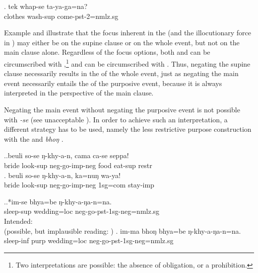 \exg. tek whap-se ta-ya-ga=na?\\
		clothes   wash{\sc -sup} come{\sc -pst-2=nmlz.sg}\\

Example \Next  and \NNext illustrate that the focus inherent in the  (and the illocutionary force in \Next) may either be on the supine clause or on the whole event, but not on the main clause alone. Regardless of the focus options, both \Next[a] and \Next[b] can be circumscribed with ,\footnote{Two interpretations are possible: the absence of obligation, or a prohibition.} and \LLast[a] can be circumscribed with . Thus, negating the supine clause necessarily results in the  of the whole event, just as negating the main event necessarily entails the  of the purposive event, because it is always interpreted in the perspective of the main clause. 

\newpage
Negating the main event without negating the purposive event is not possible with \emph{-se} (see unacceptable \NNext[a]).  In order to achieve such an interpretation, a different strategy has to be used, namely the less restrictive purpose construction with the  and \emph{bhoŋ} \NNext[b].  

\ex.\ag.beuli so-se ŋ-khy-a-n, cama ca-se seppa!\\
bride   look{\sc -sup}   {\sc neg-}go{\sc -imp-neg} food   eat{\sc -sup} {\sc restr}\\
\bg. beuli so-se ŋ-khy-a-n, ka=nuŋ wa-ya!\\
bride   look{\sc -sup} {\sc neg-}go{\sc -imp-neg} {\sc 1sg=com} stay{\sc -imp}\\

\ex.\ag.*im-se bhya=be ŋ-khy-a-ŋa-n=na.\\
sleep{\sc -sup} wedding{\sc =loc} {\sc neg-}go{\sc -pst-1sg-neg=nmlz.sg}\\
Intended:  \\
(possible, but implausible reading: )
\bg. im-ma bhoŋ bhya=be ŋ-khy-a-ŋa-n=na.\\
sleep{\sc -inf} {\sc purp} wedding{\sc =loc} {\sc neg-}go{\sc -pst-1sg-neg=nmlz.sg}\\

